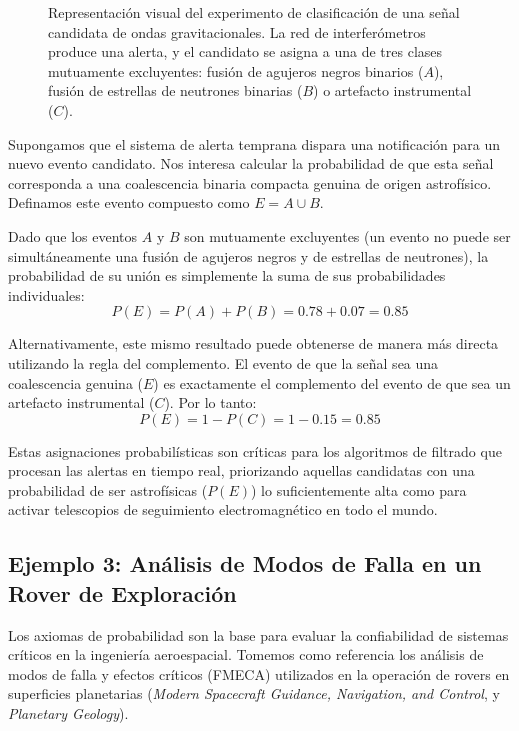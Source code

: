 \begin{figure}[htbp]
\caption{Representación visual del experimento de clasificación de una señal candidata de ondas gravitacionales. La red de interferómetros produce una alerta, y el candidato se asigna a una de tres clases mutuamente excluyentes: fusión de agujeros negros binarios ($A$), fusión de estrellas de neutrones binarias ($B$) o artefacto instrumental ($C$).}
\end{figure}


Supongamos que el sistema de alerta temprana dispara una notificación para un nuevo evento candidato. Nos interesa calcular la probabilidad de que esta señal corresponda a una coalescencia binaria compacta genuina de origen astrofísico. Definamos este evento compuesto como $E = A \cup B$.

Dado que los eventos $A$ y $B$ son mutuamente excluyentes (un evento no puede ser simultáneamente una fusión de agujeros negros y de estrellas de neutrones), la probabilidad de su unión es simplemente la suma de sus probabilidades individuales:
$$ P(E) = P(A) + P(B) = 0.78 + 0.07 = 0.85 $$

Alternativamente, este mismo resultado puede obtenerse de manera más directa utilizando la regla del complemento. El evento de que la señal sea una coalescencia genuina ($E$) es exactamente el complemento del evento de que sea un artefacto instrumental ($C$). Por lo tanto:
$$ P(E) = 1 - P(C) = 1 - 0.15 = 0.85 $$

Estas asignaciones probabilísticas son críticas para los algoritmos de filtrado que procesan las alertas en tiempo real, priorizando aquellas candidatas con una probabilidad de ser astrofísicas ($P(E)$) lo suficientemente alta como para activar telescopios de seguimiento electromagnético en todo el mundo.

\subsection{Ejemplo 3: Análisis de Modos de Falla en un Rover de Exploración}

Los axiomas de probabilidad son la base para evaluar la confiabilidad de sistemas críticos en la ingeniería aeroespacial. Tomemos como referencia los análisis de modos de falla y efectos críticos (FMECA) utilizados en la operación de rovers en superficies planetarias (\textit{Modern Spacecraft Guidance, Navigation, and Control}, y \textit{Planetary Geology}).


